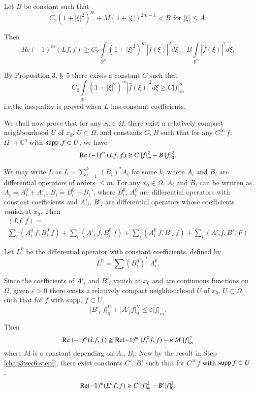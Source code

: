 Let $B$ be constant such that 
$$
C_2 (1+ | \xi |^2)^m + M (1+ | \xi |)^{2m -1} < B \text { for } | \xi | \le A.
$$

Then 
$$
Re (-1)^m (Lf, f) \ge C_2 \int\limits_{\mathbb{R}^n} (1+ | \xi |^2)^m
| \hat{f} (\xi) |^2 d \xi - B \int\limits_{\mathbb{R}^n} | \hat{f}
(\xi) |^2 d \xi. 
$$


By Proposition 3, \S\ 5 there exists a constant $C$ such that 
$$
C_2 \int\limits_{\mathbb{R}^n} (1+ | \xi | ^2)^m | \hat{f} (\xi ) |^2
d \xi \ge C | f |^2_m 
$$
i.e.\pageoriginale the inequality is proved when $L$ has constant
coefficients.  

\begin{step}\label{chap3:sec6:stepII}%
  We shall now prove that for any $x_0 \in \Omega$, there exist a
  relatively compact neighbourhood $U$ of $x_0$, $U \subset \Omega$,
  and constants $C$, $B$ such that for any $C^\infty ~ f $: $\Omega
  \rightarrow \mathbb{C}^q$ with $\operatorname{supp}. f \subset U$, we have  
  $$
  \operatorname{Re} ~ (-1)^m ~ (Lf, f) \geqq  C ~ | f |^2_m - B ~ | f |^2_0.
  $$
\end{step}

We may write $L$ as $L =\sum\limits_{i=1}^k ~ (B_i)^* A_i$ for some
$k$, where $A_i$ and $B_i$ are differential operators of orders  $\leq
m$. For any $x_0 \in \Omega$, $A_i$  and $B_i$ can be written as $A_i
= A^0_i + A'_i$, $B_i = B^0_i + B_1'$, where $B^0_i$, $A^0_i$ are
differential operators with constant coefficients and $A'_i$, $B'_i$
are differential operators whose coefficients vanish at $x_0$. Then 
\begin{multline*}
(Lf, f) =\\ 
  \sum_i (A^0_i ~ f, B^0_i ~ f) + \sum_i (A'_i ~ f,  B^0_i ~
  f) + \sum_i (A^0_i  ~ f, B'_i ~ f) + \sum_i (A'_i f, B'_i ~F) 
\end{multline*}

Let $L^0$ be the differential operator with constant coefficients, defined by 
$$
L^0 = \sum (B^0_i)^* ~ A^0_i.
$$

Since the coefficients of $A'_i$ and $B'_i$ vanish at $x_0$ and are
continuous functions on $\Omega$, given $\varepsilon > 0$ there exists
a relatively compact neighbourhood $U$ of $x_0$, $U \subset \Omega$
such that for $f$ with supp. $f \subset U$, 
$$
| B'_i  ~ f |^U_0 + | A'_i f |^U_0 \leq \varepsilon | f |_m.
$$

Then\pageoriginale
$$
\operatorname{Re} ~ (-1)^m (Lf, f) \geqq \operatorname{Re} (-1)^m ~ (L^0 f, f) - \varepsilon ~ M ~ | f |^2_m
$$
where $M$ is a constant depending on $A_i$, $B_i$. Now by the result
in Step \ref{chap3:sec6:stepI}, there exist constants $C'$, $B'$ such that for $C^\infty f $
with $\operatorname{supp} f \subset U$, 
$$
\operatorname{Re} (-1)^{m} (L^{o} f, f) \geq C' | f |^2_m - B' | f |^2_0.
$$

